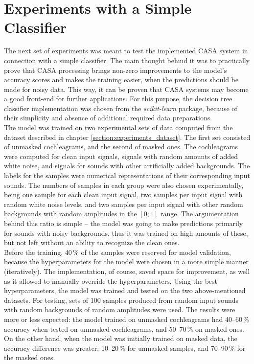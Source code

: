 \section{Experiments with a Simple Classifier}

The next set of experiments was meant to test the implemented CASA system in connection with a simple classifier. The main thought behind it was to practically prove that CASA processing brings non-zero improvements to the model's accuracy scores and makes the training easier, when the predictions should be made for noisy data. This way, it can be proven that CASA systems may become a good front-end for further applications. For this purpose, the decision tree classifier implementation was chosen from the \textit{scikit-learn} \cite{scikit-learn} package, because of their simplicity and absence of additional required data preparations.\\

The model was trained on two experimental sets of data computed from the dataset described in chapter \ref{section:experiments_dataset}. The first set consisted of unmasked cochleagrams, and the second of masked ones. The cochleagrams were computed for clean input signals, signals with random amounts of added white noise, and signals for sounds with other artificially added backgrounds. The labels for the samples were numerical representations of their corresponding input sounds. The numbers of samples in each group were also chosen experimentally, being one sample for each clean input signal, two samples per input signal with random white noise levels, and two samples per input signal with other random backgrounds with random amplitudes in the $[0; 1]$ range. The argumentation behind this ratio is simple -- the model was going to make predictions primarily for sounds with noisy backgrounds, thus it was trained on high amounts of these, but not left without an ability to recognize the clean ones.\\

Before the training, 40\,\% of the samples were reserved for model validation, because the hyperparameters for the model were chosen in a more simple manner (iteratively). The implementation, of course, saved space for improvement, as well as it allowed to manually override the hyperparameters. Using the best hyperparameters, the model was trained and tested on the two above-mentioned datasets. For testing, sets of 100 samples produced from random input sounds with random backgrounds of random amplitudes were used. The results were more or less expected: the model trained on unmasked cochleagrams had 40--60\,\% accuracy when tested on unmasked cochleagrams, and 50--70\,\% on masked ones. On the other hand, when the model was initially trained on masked data, the accuracy difference was greater: 10--20\,\% for unmasked samples, and 70--90\,\% for the masked ones.

